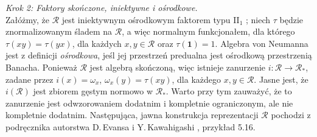{\it Krok 2: Faktory skończone, iniektywne i ośrodkowe.}\\
Załóżmy, że $\mathcal{R}$ jest iniektywnym ośrodkowym faktorem typu
II$\phantom{}_{1}$ \cite{Takesaki3};
niech $\tau$ będzie znormalizowanym śladem na $\mathcal{R}$,
a więc normalnym funkcjonałem, dla którego
$\tau(xy) = \tau(yx)$, dla każdych $x,y \in \mathcal{R}$
oraz $\tau(\mathbf{1}) = 1$.
Algebra von Neumanna jest z definicji \emph{ośrodkowa},
jeśl jej przestrzeń predualna jest ośrodkową przestrzenią Banacha.
Ponieważ $\mathcal{R}$ jest algebrą skończoną, więc istnieje zanurzenie
$i: \mathcal{R} \rightarrow
\mathcal{R}_{*}$, zadane przez $i(x) = \omega_{x}$, $\omega_{x}(y) = \tau(xy)$,
dla każdego $x,y \in \mathcal{R}$.
Jasne jest, że $i(\mathcal{R})$
jest zbiorem gęstym normowo w $\mathcal{R}_{*}$.
Warto przy tym zauważyć, że to zanurzenie jest odwzorowaniem dodatnim i kompletnie
ograniczonym, ale nie kompletnie dodatnim.
Następująca, jawna konstrukcja reprezentacji $\mathcal{R}$
pochodzi z podręcznika autorstwa D.\,Evansa  i Y.\,Kawahigashi
\cite{Evans1998}, przykład 5.16.

